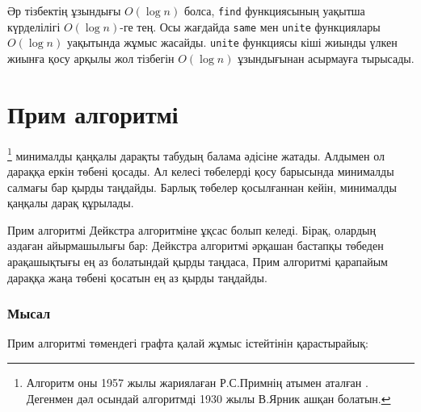 Әр тізбектің ұзындығы $O(\log n)$ болса, 
\texttt{find} функциясының уақытша күрделілігі $O(\log n)$-ге тең.
Осы жағдайда \texttt{same} мен \texttt{unite} функциялары
$O(\log n)$ уақытында жұмыс жасайды.
\texttt{unite} функциясы кіші жиынды үлкен жиынға қосу арқылы
жол тізбегін $O(\log n)$ ұзындығынан асырмауға тырысады.

\section{Прим алгоритмі}


\footnote{Алгоритм оны 1957 жылы жариялаған Р.С.Примнің атымен аталған \cite{pri57}.
Дегенмен дәл осындай алгоритмді 1930 жылы В.Ярник ашқан болатын.} 
минималды қаңқалы дарақты табудың балама әдісіне жатады.
Алдымен ол дараққа еркін төбені қосады.
Ал келесі төбелерді қосу барысында минималды салмағы бар қырды таңдайды. Барлық төбелер қосылғаннан кейін, минималды қаңқалы дарақ құрылады.

Прим алгоритмі Дейкстра алгоритміне ұқсас болып келеді.
Бірақ, олардың аздаған айырмашылығы бар: Дейкстра алгоритмі әрқашан
бастапқы төбеден арақашықтығы ең аз болатындай қырды таңдаса, Прим
алгоритмі қарапайым дараққа жаңа төбені қосатын ең аз қырды таңдайды.


\subsubsection{Мысал}

Прим алгоритмі төмендегі графта қалай жұмыс істейтінін қарастырайық:

